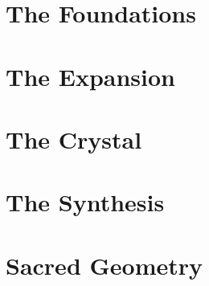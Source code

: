 \documentclass[12pt,a4paper,openany,oneside]{book}
\theoremstyle{definition}
\theoremstyle{remark}
\begin{document}
\frontmatter








\makeatletter
\renewcommand*\l@section{\@dottedtocline{1}{1.5em}{4.0em}}
\renewcommand*\l@subsection{\@dottedtocline{2}{4.5em}{4.6em}}
\renewcommand*\l@subsubsection{\@dottedtocline{3}{8.0em}{5.5em}}
\makeatother
\tableofcontents
\listoffigures
\listoftables



\mainmatter

\part{The Foundations}





\part{The Expansion}





\part{The Crystal}



\part{The Synthesis}


\part{Sacred Geometry}









\end{document}
